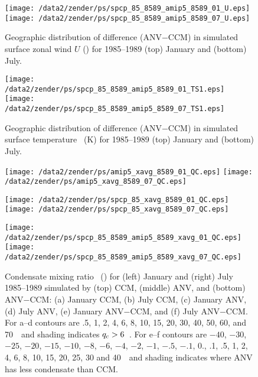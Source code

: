 \documentclass[twocolumn,final]{article}
\begin{document}
\begin{figure}
\begin{center}
\texttt{[image: /data2/zender/ps/spcp\_85\_8589\_amip5\_8589\_01\_U.eps]}\vfill
\texttt{[image: /data2/zender/ps/spcp\_85\_8589\_amip5\_8589\_07\_U.eps]}\vfill
\end{center}
\caption[Geographic distribution of difference (ANV$-$CCM) in
simulated surface zonal wind $U$ between ANV and CCM for
January and July 1985--1989]{  
Geographic distribution of difference (ANV$-$CCM) in simulated
surface zonal wind $U$ (\mxs) for 1985--1989 (top) January
and (bottom) July. 
\label{fig:spcp_85_8589_amip5_8589_U}}
\end{figure}

\begin{figure}
\begin{center}
\texttt{[image: /data2/zender/ps/spcp\_85\_8589\_amip5\_8589\_01\_TS1.eps]}\vfill
\texttt{[image: /data2/zender/ps/spcp\_85\_8589\_amip5\_8589\_07\_TS1.eps]}\vfill
\end{center}
\caption[Geographic distribution of difference (ANV$-$CCM) in
simulated surface temperature \Ts\ between ANV and CCM for
January and July 1985--1989]{ 
Geographic distribution of difference (ANV$-$CCM) in simulated
surface temperature \Ts\ (\degreee K) for 1985--1989 (top) January and
(bottom) July. 
\label{fig:spcp_85_8589_amip5_8589_TS1}}
\end{figure}
\clearpage

\begin{figure*}
\begin{center}
\texttt{[image: /data2/zender/ps/amip5\_xavg\_8589\_01\_QC.eps]}%
\texttt{[image: /data2/zender/ps/amip5\_xavg\_8589\_07\_QC.eps]}%

\texttt{[image: /data2/zender/ps/spcp\_85\_xavg\_8589\_01\_QC.eps]}%
\texttt{[image: /data2/zender/ps/spcp\_85\_xavg\_8589\_07\_QC.eps]}%

\texttt{[image: /data2/zender/ps/spcp\_85\_8589\_amip5\_8589\_xavg\_01\_QC.eps]}%
\texttt{[image: /data2/zender/ps/spcp\_85\_8589\_amip5\_8589\_xavg\_07\_QC.eps]}%
\end{center}
\caption[Condensate mixing ratio \qc\ for January and July
1985--1989 simulated by CCM, ANV, and ANV$-$CCM]{
Condensate mixing ratio \qc\ (\mgxkg) for (left) January and (right)
July 1985--1989 simulated by (top) CCM, (middle) ANV, and (bottom)
ANV$-$CCM: (a) January CCM, (b) July CCM, (c) January ANV, (d) July
ANV, (e) January ANV$-$CCM, and (f) July ANV$-$CCM. 
For a--d contours are .5, 1, 2, 4, 6, 8, 10, 15, 20, 30, 40, 50, 60,
and 70~\mgxkg\ and shading indicates $\mbox{$q_\mathrm{c}$} > 6$~\mgxkg.
For e--f contours are $-40$, $-30$, $-25$, $-20$, $-15$, $-10$, $-8$,
$-6$, $-4$, $-2$, $-1$, $-.5$, $-.1$, 0., .1, .5, 1, 2, 4, 6, 8, 10,
15, 20, 25, 30 and 40~\mgxkg\ and shading indicates where ANV has less
condensate than CCM.  
\label{fig:xavg_8589_QC}}   
\end{figure*}
\clearpage
\end{document}
